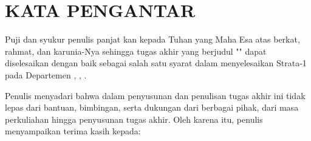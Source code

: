 \chapter*{KATA PENGANTAR}

\vspace{2ex}


Puji dan syukur penulis panjat kan kepada Tuhan yang Maha Esa atas
berkat, rahmat, dan karunia-Nya sehingga tugas akhir yang berjudul "\tatitle" dapat
diselesaikan dengan baik sebagai salah satu syarat dalam menyelesaikan Strata-1
pada Departemen \studyprogram{}, \faculty{}, \institute{}.

Penulis menyadari bahwa dalam penyusunan dan penulisan tugas akhir ini
tidak lepas dari bantuan, bimbingan, serta dukungan dari berbagai pihak, dari masa
perkuliahan hingga penyusunan tugas akhir. Oleh karena itu, penulis menyampaikan
terima kasih kepada:

